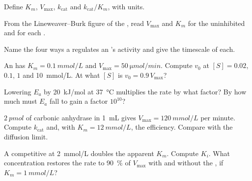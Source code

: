\begin{exercise}[$\star$]\label{exo:b1:enzymes:2}
Define $K_m$, $V_{\max}$, $k_{\text{cat}}$ and $k_{\text{cat}}/K_m$,
with units.
\end{exercise}

\begin{exercise}[$\star$]\label{exo:b1:enzymes:3}
From the Lineweaver--Burk figure of the , read $V_{\max}$
and $K_m$ for the uninhibited  and for each .
\end{exercise}

\begin{exercise}[$\star$]\label{exo:b1:enzymes:4}
Name the four ways a  regulates an 's activity and give
the timescale of each.
\end{exercise}

\begin{exercise}[$\star\star$]\label{exo:b1:enzymes:5}
An  has $K_m = \qty{0.1}{mmol/L}$ and $V_{\max} =
\qty{50}{\micro mol/min}$. Compute $v_0$ at $[S] = 0.02$, $0.1$, $1$
and \qty{10}{mmol/L}. At what $[S]$ is $v_0 = 0.9\,V_{\max}$?
\end{exercise}

\begin{exercise}[$\star\star$]\label{exo:b1:enzymes:6}
Lowering $E_a$ by \qty{20}{kJ/mol} at \qty{37}{\celsius} multiplies
the rate by what factor? By how much must $E_a$ fall to gain a factor
$10^{10}$?
\end{exercise}

\begin{exercise}[$\star\star$]\label{exo:b1:enzymes:7}
$\qty{2}{pmol}$ of carbonic anhydrase in \qty{1}{mL} gives
$V_{\max} = \qty{120}{mmol/L}$ per minute. Compute $k_{\text{cat}}$
and, with $K_m = \qty{12}{mmol/L}$, the efficiency. Compare with the
diffusion limit.
\end{exercise}

\begin{exercise}[$\star\star$]\label{exo:b1:enzymes:8}
A competitive  at \qty{2}{mmol/L} doubles the apparent $K_m$.
Compute $K_i$. What  concentration restores the rate to
\qty{90}{\%} of $V_{\max}$ with and without the , if
$K_m = \qty{1}{mmol/L}$?
\end{exercise}

